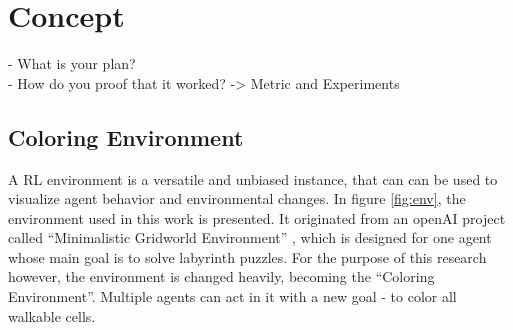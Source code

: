 %
%
\chapter{Concept}\label{sec:Concept}
- What is your plan? \\
- How do you proof that it worked? -> Metric and Experiments


\section{Coloring Environment}\label{env}
A RL environment is a versatile and unbiased instance, that can can be used to visualize agent behavior and environmental changes.
In figure \ref{fig:env}, the environment used in this work is presented. It originated from an openAI project called ``Minimalistic Gridworld Environment'' \cite{chwi18}, which is designed for one agent whose main goal is to solve labyrinth puzzles. For the purpose of this research however, the environment is changed heavily, becoming the ``Coloring Environment''. Multiple agents can act in it with a new goal - to color all walkable cells.

